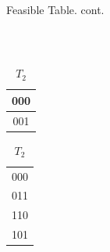 \documentclass[xcolor=dvipsnames, aspectratio=169]{beamer}
\begin{document}
\begin{frame}{Feasible Table. cont. }
\begin{enumerate}[]
\begin{example}
\begin{columns}[c]
\begin{column}{.5\textwidth}
\\
				\centering
						\begin{table}[h]
					\begin{subtable}[h]{0.45\textwidth}
								\centering
							\begin{tabular}{|c|}
								\hline
								000 \\
								\hline
								001 \\
								\hline
							\end{tabular}
							\caption*{$T_1$}
						\end{subtable}
						\begin{subtable}[h]{0.45\textwidth}
							\centering
							\begin{tabular}{|c|}
								\hline
								000  \\
								011   \\
								110  \\
								101   \\
								\hline
							\end{tabular}
							\caption*{$T_2$}
						\end{subtable}
						\end{table}
				\end{column}
			\end{columns}
		\end{example}
	\end{enumerate}
\end{frame}
\end{document}
